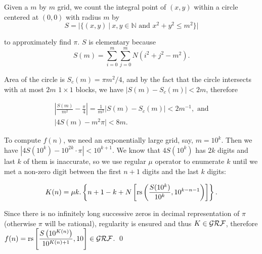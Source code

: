 
\begin{pf} \rm
 Given a $m$ by $m$ grid, we count the integral point of $(x,y)$
 within a circle centered at $(0, 0)$ with radius $m$ by 
\[
 S = \Big| \{ (x, y) ~|~ x,y\in\mathbb{N}\textrm{ and }x^2 + y^2 \leq m^2 \} \Big|
\]

\noindent to approximately find $\pi$. $S$ is elementary because
\[
 S(m) = \sum_{i=0}^{m} \sum_{j=0}^{m} N(i^2 + j^2 - m^2).
\]

\noindent Area of the circle is $S_c(m) = \pi m^2 / 4$, 
and by the fact that the circle intersects with at most $2m$ $1\times 1$ blocks,
we have $|S(m)-S_c(m)|<2m$, therefore

\[
\begin{array}{c}
 \displaystyle
   \left| 
   \frac{S(m)}{m^2} - \frac{\pi}{4}
   \right| = \frac{1}{m^2} |S(m) - S_c(m)| < 2 m^{-1}, \textrm{ and}\\
 \displaystyle
 \big| 4S(m) - m^2 \pi\big| < 8m.
\end{array}
\]

To compute $f(n)$, we need an exponentially large grid, say, $m=10^{k}$.
Then we have $|4S(10^{k}) - 10^{2k}\cdot\pi| < 10^{k+1}$.
We know that $4S(10^k)$ has $2k$ digits and last $k$ of them is inaccurate,
so we use regular $\mu$ operator to enumerate $k$ until we met a non-zero digit
between the first $n+1$ digits and the last $k$ digits:

\[
  K(n) = \mu k. \left\{ n + 1 - k + 
    N\left[\mathrm{rs} \left( \frac{S(10^k)}{10^k}, 10^{k-n-1} \right)\right] \right\}.
\]

\noindent Since there is no infinitely long successive zeros in decimal representation of $\pi$
(otherwise $\pi$ will be rational), regularity is ensured and thus $K\in\mathcal{GRF}$,
therefore
$\displaystyle  f(n) = \mathrm{rs}\left[ \frac{ S\left(10^{K(n)}\right)}{10^{K(n) + 1} } , 10 \right]\in\mathcal{GRF}$. 
\qed
\end{pf}

